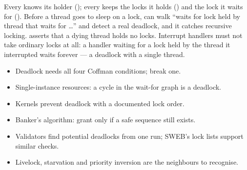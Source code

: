 \begin{swebbox}
Every  knows its holder (); every
 keeps the locks it holds () and
the lock it waits for (). Before a thread goes
to sleep on a lock,  can walk ``waits for lock
held by thread that waits for \dots'' and detect a real deadlock, and it
catches recursive locking.  asserts that a dying thread
holds no locks. Interrupt handlers must not take ordinary locks at all:
a handler waiting for a lock held by the thread it interrupted waits
forever --- a deadlock with a single thread.
\end{swebbox}

\begin{keybox}
\begin{itemize}
  \item Deadlock needs all four Coffman conditions; break one.
  \item Single-instance resources: a cycle in the wait-for graph is a
    deadlock.
  \item Kernels prevent deadlock with a documented lock order.
  \item Banker's algorithm: grant only if a safe sequence still exists.
  \item Validators find potential deadlocks from one run; SWEB's lock
    lists support similar checks.
  \item Livelock, starvation and priority inversion are the neighbours to
    recognise.
\end{itemize}
\end{keybox}
